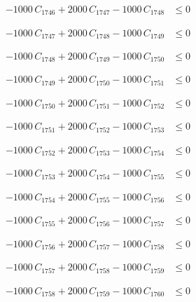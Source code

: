 \documentclass[a4paper,11pt]{article}
\begin{document}
\begin{align}
-1000\,C_{1746} + 2000\,C_{1747} - 1000\,C_{1748} &\leq 0 \nonumber
\end{align}

\begin{align}
-1000\,C_{1747} + 2000\,C_{1748} - 1000\,C_{1749} &\leq 0 \nonumber
\end{align}

\begin{align}
-1000\,C_{1748} + 2000\,C_{1749} - 1000\,C_{1750} &\leq 0 \nonumber
\end{align}

\begin{align}
-1000\,C_{1749} + 2000\,C_{1750} - 1000\,C_{1751} &\leq 0 \nonumber
\end{align}

\begin{align}
-1000\,C_{1750} + 2000\,C_{1751} - 1000\,C_{1752} &\leq 0 \nonumber
\end{align}

\begin{align}
-1000\,C_{1751} + 2000\,C_{1752} - 1000\,C_{1753} &\leq 0 \nonumber
\end{align}

\begin{align}
-1000\,C_{1752} + 2000\,C_{1753} - 1000\,C_{1754} &\leq 0 \nonumber
\end{align}

\begin{align}
-1000\,C_{1753} + 2000\,C_{1754} - 1000\,C_{1755} &\leq 0 \nonumber
\end{align}

\begin{align}
-1000\,C_{1754} + 2000\,C_{1755} - 1000\,C_{1756} &\leq 0 \nonumber
\end{align}

\begin{align}
-1000\,C_{1755} + 2000\,C_{1756} - 1000\,C_{1757} &\leq 0 \nonumber
\end{align}

\begin{align}
-1000\,C_{1756} + 2000\,C_{1757} - 1000\,C_{1758} &\leq 0 \nonumber
\end{align}

\begin{align}
-1000\,C_{1757} + 2000\,C_{1758} - 1000\,C_{1759} &\leq 0 \nonumber
\end{align}

\begin{align}
-1000\,C_{1758} + 2000\,C_{1759} - 1000\,C_{1760} &\leq 0 \nonumber
\end{align}
\end{document}
